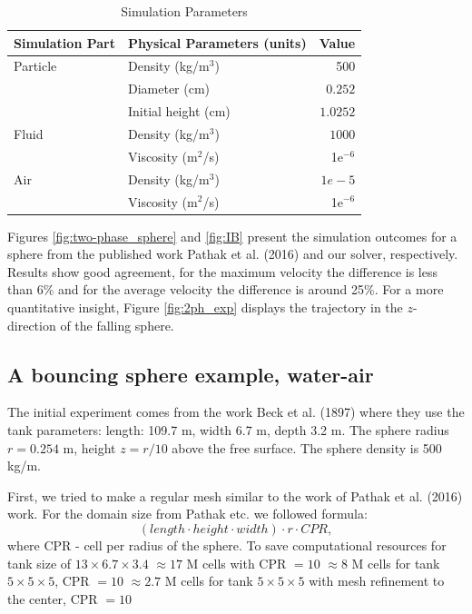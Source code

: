 \begin{table}[H]
    \centering
    \caption{Simulation Parameters} \label{table2-chap4}
    \begin{tabular}{llr}
        \toprule
        \hline
        Simulation Part         & Physical Parameters (units) & Value \\
        \hline
        \midrule
        Particle                 & Density (kg/m$^3$)          & 500    \\
                         & Diameter (cm)          & $0.252$    \\
                         & Initial height (cm)          & $1.0252$    \\
                         \hline
        Fluid                  & Density (kg/m$^3$)           & $1000$   \\
                                & Viscosity (m$^2$/s)         & 1e$^{-6}$    \\
                                \hline
         Air                  & Density (kg/m$^3$)           & $1e-5$   \\
                                & Viscosity (m$^2$/s)         & 1e$^{-6}$    \\
                                \hline
        \bottomrule
     \end{tabular}
\end{table}
Figures \ref{fig:two-phase_sphere} and \ref{fig:IB} present the simulation outcomes for a sphere from the published work Pathak et al. (2016) \cite{pathak20163d} and our solver, respectively. Results show good agreement, for the maximum velocity the difference is less than 6\% and for the average velocity the difference is around 25\%. For a more quantitative insight, Figure \ref{fig:2ph_exp} displays the trajectory in the $z$-direction of the falling sphere.

\subsection{A bouncing sphere example, water-air}
The initial experiment comes from the work Beck et al. (1897) \cite{beck1987transient} where they use the tank parameters: length: 109.7 m, width 6.7 m, depth 3.2 m. The sphere radius $r= 0.254$ m, height $z = r/10$ above the free surface. The sphere density is 500 kg/m.

First, we tried to make a regular mesh similar to the work of Pathak et al. (2016) \cite{pathak20163d} work. For the domain size from Pathak etc.\cite{pathak20163d} we followed formula:
\begin{equation}
    (length \cdot height \cdot width)  \cdot  r  \cdot  CPR,
\end{equation}
where CPR - cell per radius of the sphere. To save computational resources for tank size of $13\times 6.7 \times 3.4$ $\approx 17$ M cells with CPR $= 10$ $\approx 8$ M cells for tank $5\times 5 \times 5$, CPR $= 10$
 $\approx 2.7$ M cells for tank $5\times 5 \times 5$ with mesh refinement to the center, CPR $= 10$

